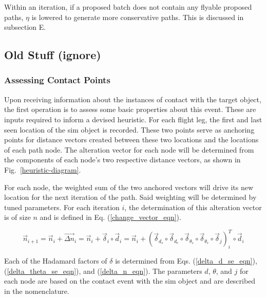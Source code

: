 \documentclass[conf]{new-aiaa}
\begin{document}
Within an iteration, if a proposed batch does not contain any flyable proposed paths, $\eta$ is lowered to generate more conservative paths. This is discussed in subsection E.












\iffalse


\subsection{Old Stuff (ignore)}
\subsubsection{Assessing Contact Points}
Upon receiving information about the instances of contact with the target object, the first operation is to assess some basic properties about this event. These are inputs required to inform a devised heuristic. For each flight leg, the first and last seen location of the sim object is recorded. These two points serve as anchoring points for distance vectors created between these two locations and the locations of each path node. The alteration vector for each node will be determined from the components of each node's two respective distance vectors, as shown in Fig.~\ref{heuristic-diagram}.


For each node, the weighted sum of the two anchored vectors will drive its new location for the next iteration of the path. Said weighting will be determined by tuned parameters. For each iteration $i$, the determination of this alteration vector is of size $n$ and is defined in Eq. (\ref{change_vector_eqn}).

\begin{equation}
\label{change_vector_eqn}
\vec{n}_{i + 1} = \vec{n}_i + \vec{{\Delta}{n}}_i = \vec{n}_i + {\vec{\delta}}_i\circ{\vec{d}}_i = \vec{n}_i + \left({\vec{\delta}_{d_s}}\circ{\vec{\delta}_{d_e}}\circ{\vec{\delta}_{\theta_s}}\circ{\vec{\delta}_{\theta_e}}\circ{\vec{\delta}_j}\right)_i^T\circ{\vec{d}}_i
\end{equation}

Each of the Hadamard factors of $\delta$ is determined from Eqs. (\ref{delta_d_se_eqn}), (\ref{delta_theta_se_eqn}), and (\ref{delta_n_eqn}). The parameters $d$, $\theta$, and $j$ for each node are based on the contact event with the sim object and are described in the nomenclature.
\end{document}

